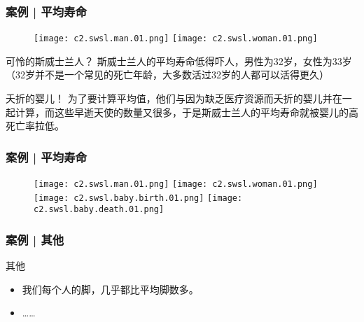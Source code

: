 \begin{frame}
  \frametitle{案例 | 平均寿命}
  \begin{figure}
    \centering
    \texttt{[image: c2.swsl.man.01.png]}
    \texttt{[image: c2.swsl.woman.01.png]}
  \end{figure}
  \vspace{-1em}
  \begin{block}{可怜的斯威士兰人？}
    斯威士兰人的平均寿命低得吓人，男性为32岁，女性为33岁（32岁并不是一个常见的死亡年龄，大多数活过32岁的人都可以活得更久）
  \end{block}
  \pause \pause \pause \pause
  \begin{block}{夭折的婴儿！}
    为了要计算平均值，他们与因为缺乏医疗资源而夭折的婴儿并在一起计算，而这些早逝天使的数量又很多，于是斯威士兰人的平均寿命就被婴儿的高死亡率拉低。
  \end{block}
\end{frame}

\begin{frame}
  \frametitle{案例 | 平均寿命}
  \begin{figure}
    \centering
    \texttt{[image: c2.swsl.man.01.png]}
    \texttt{[image: c2.swsl.woman.01.png]}\\
    \texttt{[image: c2.swsl.baby.birth.01.png]}
    \texttt{[image: c2.swsl.baby.death.01.png]}\\
  \end{figure}
\end{frame}

\begin{frame}
  \frametitle{案例 | 其他}
  \begin{block}{其他}
    \begin{itemize}
      \item 我们每个人的脚，几乎都比平均脚数多。
      \item ……
    \end{itemize}
  \end{block}
\end{frame}


